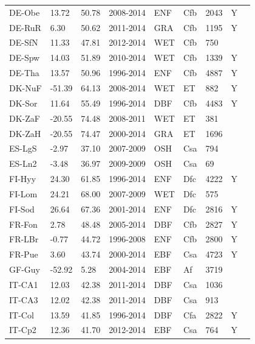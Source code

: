 \documentclass[gmd, manuscript]{copernicus}
\begin{document}
\begin{table}
\begin{tabular}{lllllllll}
  DE-Obe & 13.72 & 50.78 & 2008-2014 & ENF & Cfb & 2043 & Y & \citet{DE-Obe} \\ 
  DE-RuR & 6.30 & 50.62 & 2011-2014 & GRA & Cfb & 1195 & Y & \citet{DE-RuR} \\ 
  DE-SfN & 11.33 & 47.81 & 2012-2014 & WET & Cfb & 750 &  & \citet{DE-SfN} \\ 
  DE-Spw & 14.03 & 51.89 & 2010-2014 & WET & Cfb & 1339 & Y & \citet{DE-Spw} \\ 
  DE-Tha & 13.57 & 50.96 & 1996-2014 & ENF & Cfb & 4887 & Y & \citet{DE-Tha} \\ 
  DK-NuF & -51.39 & 64.13 & 2008-2014 & WET & ET & 882 & Y & \citet{DK-NuF} \\ 
  DK-Sor & 11.64 & 55.49 & 1996-2014 & DBF & Cfb & 4483 & Y & \citet{DK-Sor} \\ 
  DK-ZaF & -20.55 & 74.48 & 2008-2011 & WET & ET & 381 &  & \citet{DK-ZaF} \\ 
  DK-ZaH & -20.55 & 74.47 & 2000-2014 & GRA & ET & 1696 &  & \citet{DK-ZaH} \\ 
  ES-LgS & -2.97 & 37.10 & 2007-2009 & OSH & Csa & 794 &  & \citet{ES-LgS} \\ 
  ES-Ln2 & -3.48 & 36.97 & 2009-2009 & OSH & Csa &  69 &  & \citet{ES-Ln2} \\ 
  FI-Hyy & 24.30 & 61.85 & 1996-2014 & ENF & Dfc & 4222 & Y & \citet{FI-Hyy} \\ 
  FI-Lom & 24.21 & 68.00 & 2007-2009 & WET & Dfc & 575 &  & \citet{FI-Lom} \\ 
  FI-Sod & 26.64 & 67.36 & 2001-2014 & ENF & Dfc & 2816 & Y & \citet{FI-Sod} \\ 
  FR-Fon & 2.78 & 48.48 & 2005-2014 & DBF & Cfb & 2827 & Y & \citet{FR-Fon} \\ 
  FR-LBr & -0.77 & 44.72 & 1996-2008 & ENF & Cfb & 2800 & Y & \citet{FR-LBr} \\ 
  FR-Pue & 3.60 & 43.74 & 2000-2014 & EBF & Csa & 4723 & Y & \citet{FR-Pue} \\ 
  GF-Guy & -52.92 & 5.28 & 2004-2014 & EBF & Af & 3719 &  & \citet{GF-Guy} \\ 
  IT-CA1 & 12.03 & 42.38 & 2011-2014 & DBF & Csa & 1036 &  & \citet{IT-CA1} \\ 
  IT-CA3 & 12.02 & 42.38 & 2011-2014 & DBF & Csa & 913 &  & \citet{IT-CA3} \\ 
  IT-Col & 13.59 & 41.85 & 1996-2014 & DBF & Cfa & 2822 & Y & \citet{IT-Col} \\ 
  IT-Cp2 & 12.36 & 41.70 & 2012-2014 & EBF & Csa & 764 & Y & \citet{IT-Cp2} \\ 

\end{tabular}
\end{table}
\end{document}
